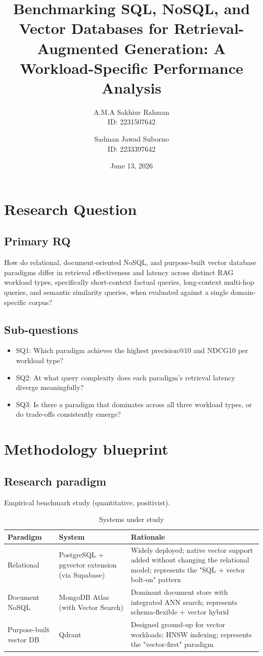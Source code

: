 \documentclass{article}
\title{\Large Benchmarking SQL, NoSQL, and Vector Databases for Retrieval-Augmented Generation: A Workload-Specific Performance Analysis}
\author{A.M.A Sakhiur Rahman \\ ID: 2231507642 \and Sadman Jawad Suborno \\ ID: 2233397642}
\date{June 13, 2026}
\begin{document}
\maketitle

\section{Research Question}

\subsection{Primary RQ}
How do relational, document-oriented NoSQL, and purpose-built vector database paradigms differ in retrieval effectiveness and latency across distinct RAG workload types, specifically short-context factual queries, long-context multi-hop queries, and semantic similarity queries, when evaluated against a single domain-specific corpus?

\subsection{Sub-questions}
\begin{itemize}[leftmargin=*]
\item SQ1: Which paradigm achieves the highest precision@10 and NDCG10 per workload type?
\item SQ2: At what query complexity does each paradigm's retrieval latency diverge meaningfully?
\item SQ3: Is there a paradigm that dominates across all three workload types, or do trade-offs consistently emerge?
\end{itemize}

\section{Methodology blueprint}

\subsection{Research paradigm}
Empirical benchmark study (quantitative, positivist).

\begin{table}[h]
\centering
\caption{Systems under study}
\begin{tabularx}{\linewidth}{@{}lXX@{}}
\toprule
Paradigm & System & Rationale \\
\midrule
Relational & PostgreSQL + pgvector extension (via Supabase) & Widely deployed; native vector support added without changing the relational model; represents the "SQL + vector bolt-on" pattern \\
Document NoSQL & MongoDB Atlas (with Vector Search) & Dominant document store with integrated ANN search; represents schema-flexible + vector hybrid \\
Purpose-built vector DB & Qdrant & Designed ground-up for vector workloads; HNSW indexing; represents the "vector-first" paradigm \\
\bottomrule
\end{tabularx}
\end{table}
\end{document}
